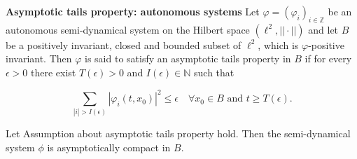\documentclass[11pt]{beamer}
\begin{document}
\begin{frame}
    \textbf{Asymptotic tails property: autonomous systems} 
    Let $\varphi = (\varphi_i)_{i \in \mathbb{Z}}$ be an autonomous semi-dynamical system on the Hilbert space $(\ell^2, || \cdot ||)$ and let $B$ be a positively invariant, closed and bounded subset of $\ell^2$, which is $\varphi$-positive invariant. Then $\varphi$ is said to satisfy an asymptotic tails property in $B$ if for every $\epsilon > 0$ there exist $T(\epsilon) > 0$ and $I(\epsilon) \in \mathbb{N}$ such that 
    
    $$\sum_{|i| > I(\epsilon)} |\varphi_i(t, x_0)|^2 \leq \epsilon \quad \forall x_0 \in B \text{ and } t \geq T(\epsilon).$$

\begin{lemma}[2.5]
    Let Assumption about asymptotic tails property hold.
    Then the semi-dynamical system \(\phi\) is asymptotically compact in \(B\).
\end{lemma}
\end{frame}
\end{document}
